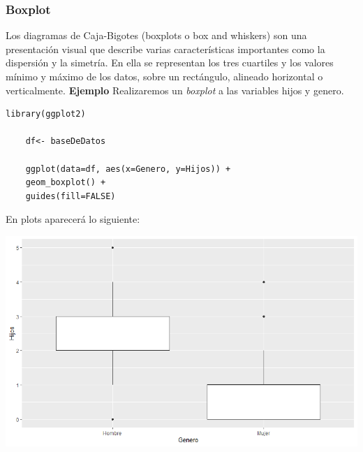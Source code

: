 \documentclass[12pt,hidelinks]{article}
\begin{document}
	\subsubsection{Boxplot}
	Los diagramas de Caja-Bigotes (boxplots o box and whiskers) son una presentación visual que describe varias características importantes como la dispersión y la simetría. En ella se representan los tres cuartiles y los valores mínimo y máximo de los datos, sobre un rectángulo, alineado horizontal o verticalmente. \textbf{Ejemplo} Realizaremos un  \textit{boxplot} a las variables hijos y genero.
	\begin{lstlisting}[frame=single]
	library(ggplot2)
	
	df<- baseDeDatos
	
	ggplot(data=df, aes(x=Genero, y=Hijos)) + 
	geom_boxplot() +
	guides(fill=FALSE)
	\end{lstlisting}
	En plots aparecerá lo siguiente:
	\begin{center}
		\includegraphics[width = 14cm]{images/2/GaficaBox.png}
	\end{center}
\end{document}
